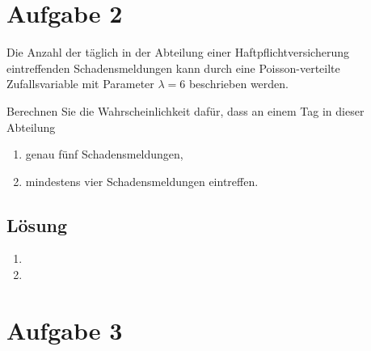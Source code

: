 \documentclass{exercise}
\begin{document}
    \section*{Aufgabe 2}

    \begin{problem}
        Die Anzahl der täglich in der Abteilung einer Haftpflichtversicherung eintreffenden Schadensmeldungen kann durch eine Poisson-verteilte Zufallsvariable mit Parameter \(\lambda = 6\) beschrieben werden.

        Berechnen Sie die Wahrscheinlichkeit dafür, dass an einem Tag in dieser Abteilung
        \begin{enumerate}
            \item genau fünf Schadensmeldungen,
            \item mindestens vier Schadensmeldungen eintreffen.
        \end{enumerate}
    \end{problem}

    \subsection*{Lösung}
    \begin{enumerate}
        \item
        \item 
    \end{enumerate}


    \section*{Aufgabe 3}
\end{document}
